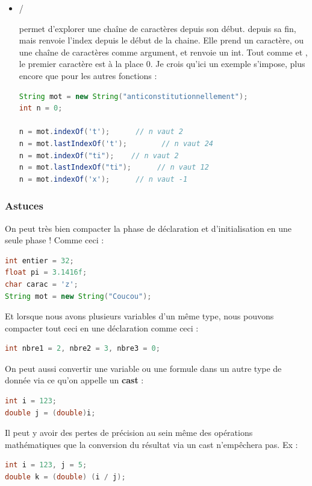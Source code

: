 \documentclass[a4paper,twoside]{article}
\begin{document}
\begin{itemize}
\item {}/

 permet d'explorer une chaîne de caractères depuis son début.  depuis sa fin, mais renvoie l'index depuis le début de la chaine. Elle prend un caractère, ou une chaîne de caractères comme argument, et renvoie un int. Tout comme  et , le premier caractère est à la place 0. Je crois qu'ici un exemple s'impose, plus encore que pour les autres fonctions :
\begin{lstlisting}[language=java]
String mot = new String("anticonstitutionnellement");
int n = 0;
 
n = mot.indexOf('t');      // n vaut 2
n = mot.lastIndexOf('t');        // n vaut 24
n = mot.indexOf("ti");    // n vaut 2
n = mot.lastIndexOf("ti");      // n vaut 12
n = mot.indexOf('x');      // n vaut -1
\end{lstlisting}
\end{itemize}

\subsubsection{Astuces}
On peut très bien compacter la phase de déclaration et d'initialisation en une seule phase ! Comme ceci :
\begin{lstlisting}[language=java]
int entier = 32;
float pi = 3.1416f;
char carac = 'z';
String mot = new String("Coucou");
\end{lstlisting}

Et lorsque nous avons plusieurs variables d'un même type, nous pouvons compacter tout ceci en une déclaration comme ceci :
\begin{lstlisting}[language=java]
int nbre1 = 2, nbre2 = 3, nbre3 = 0;
\end{lstlisting}

\bigskip

On peut aussi convertir une variable ou une formule dans un autre type de donnée via ce qu'on appelle un \textbf{cast} :
\begin{lstlisting}[language=java]
int i = 123;
double j = (double)i;
\end{lstlisting}

\begin{attention}
Il peut y avoir des pertes de précision au sein même des opérations mathématiques que la conversion du résultat via un cast n'empêchera pas. 
Ex :
\begin{lstlisting}[language=java]
int i = 123, j = 5;
double k = (double) (i / j);
\end{lstlisting}
\end{attention}
\end{document}
